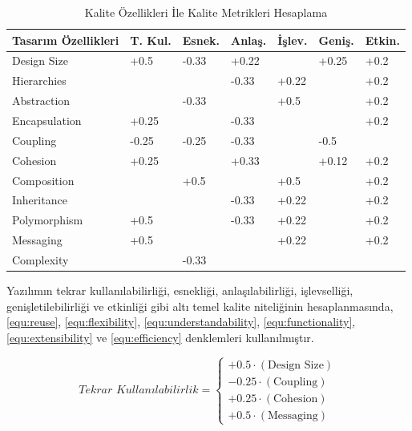 \documentclass[conference]{IEEEtran}
\begin{document}
\begin{table}[h]
	\centering
	\begin{tabular}{|l|l|l|l|l|l|l|}
		\hline
		Tasarım Özellikleri & T. Kul. & Esnek. & Anlaş. & İşlev. & Geniş. & Etkin. \\ \hline
		Design Size         & +0.5    & -0.33  & +0.22  &        & +0.25  & +0.2   \\ \hline
		Hierarchies         &         &        & -0.33  & +0.22  &        & +0.2   \\ \hline
		Abstraction         &         & -0.33  &        & +0.5   &        & +0.2   \\ \hline
		Encapsulation       & +0.25   &        & -0.33  &        &        & +0.2   \\ \hline
		Coupling            & -0.25   & -0.25  & -0.33  &        & -0.5   &        \\ \hline
		Cohesion            & +0.25   &        & +0.33  &        & +0.12  & +0.2   \\ \hline
		Composition         &         & +0.5   &        & +0.5   &        & +0.2   \\ \hline
		Inheritance         &         &        & -0.33  & +0.22  &        & +0.2   \\ \hline
		Polymorphism        & +0.5    &        & -0.33  & +0.22  &        & +0.2   \\ \hline
		Messaging           & +0.5    &        &        & +0.22  &        & +0.2   \\ \hline
		Complexity          &         & -0.33  &        &        &        &        \\ \hline
	\end{tabular}
	\caption{Kalite Özellikleri İle Kalite Metrikleri
		Hesaplama
	}
	\label{table:2}
\end{table}

Yazılımın tekrar kullanılabilirliği, esnekliği, anlaşılabilirliği, işlevselliği, genişletilebilirliği ve etkinliği gibi altı temel kalite niteliğinin hesaplanmasında, \ref{equ:reuse}, \ref{equ:flexibility}, \ref{equ:understandability}, \ref{equ:functionality}, \ref{equ:extensibility} ve \ref{equ:efficiency} denklemleri kullanılmıştır.

\begin{equation}
	\textit{Tekrar Kullanılabilirlik} =
	\begin{cases}
		+0.5 \cdot (\text{Design Size}) \\
		-0.25 \cdot (\text{Coupling}) \\
		+0.25 \cdot (\text{Cohesion}) \\
		+0.5 \cdot (\text{Messaging})
	\end{cases}
	\label{equ:reuse}
\end{equation}
\end{document}
